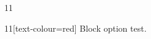\documentclass[paper=A4]{ropas-poster}
\begin{document}
\begin{postergrid}{1}{1}
\begin{posterblock}{1}{1}[text-colour=red]
Block option test.
\end{posterblock}
\end{postergrid}
\end{document}
